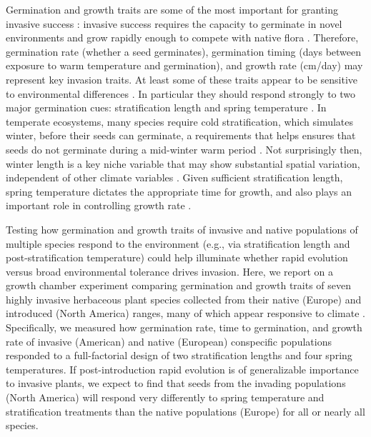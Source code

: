 \documentclass[12pt]{article}\usepackage[]{graphicx}\usepackage[]{color}
\begin{document}
	Germination and growth traits are some of the most important for granting invasive success \parencite{Sattin1997, Maillet2000}: invasive success requires the capacity to germinate in novel environments and grow rapidly enough to compete with native flora \parencite{Grime1988, Gioria2017}. Therefore, germination rate (whether a seed germinates), germination timing (days between exposure to warm temperature and germination), and growth rate (cm/day) may represent key invasion traits. At least some of these traits appear to be sensitive to environmental differences \parencite{Leger2007}.  In particular they should respond strongly to two major germination cues: stratification length and spring temperature \parencite{Finch2006}. In temperate ecosystems, many species require cold stratification, which simulates winter, before their seeds can germinate, a requirements that helps ensures that seeds do not germinate during a mid-winter warm period \parencite{Baskin1998,Popay1970,Wulff1994}. Not surprisingly then, winter length is a key niche variable \parencite{Harte2015} that may show substantial spatial variation, independent of other climate variables \parencite{Bonan2003}. Given sufficient stratification length, spring temperature dictates the appropriate time for growth, and also plays an important role in controlling growth rate \parencite{Egli1980,Guilioni2003}. %
	
Testing how germination and growth traits of invasive and native populations of multiple species respond to the environment (e.g., via stratification length and post-stratification temperature) could help illuminate whether rapid evolution versus broad environmental tolerance drives invasion. Here, we report on a growth chamber experiment comparing germination and growth traits of seven highly invasive herbaceous plant species collected from their native (Europe) and introduced (North America) ranges, many of which appear responsive to climate \parencite{Wolkovich2014}. Specifically, we measured how germination rate, time to germination, and growth rate of invasive (American) and native (European) conspecific populations responded to a full-factorial design of two stratification lengths and four spring temperatures. If post-introduction rapid evolution is of generalizable importance to invasive plants, we expect to find that seeds from the invading populations (North America) will respond very differently to spring temperature and stratification treatments than the native populations (Europe) for all or nearly all species.
\end{document}
